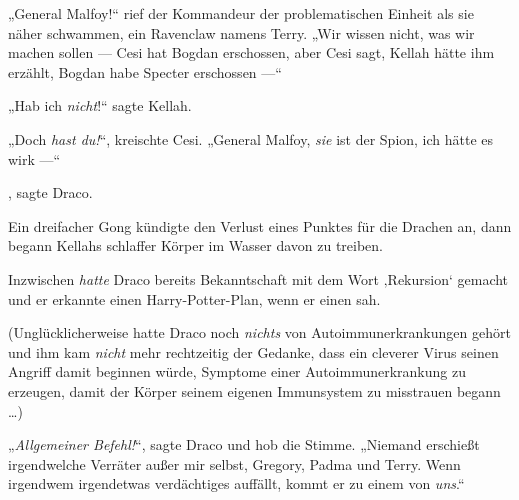 „General Malfoy!“ rief der Kommandeur der problematischen Einheit als sie näher schwammen, ein Ravenclaw namens Terry.
„Wir wissen nicht, was wir machen sollen — Cesi hat Bogdan erschossen, aber Cesi sagt, Kellah hätte ihm erzählt, Bogdan habe Specter erschossen —“

„Hab ich \emph{nicht}!“ sagte Kellah.

„Doch \emph{hast du!}“, kreischte Cesi.
„General Malfoy, \emph{sie} ist der Spion, ich hätte es wirk —“

, sagte Draco.

Ein dreifacher Gong kündigte den Verlust eines Punktes für die Drachen an, dann begann Kellahs schlaffer Körper im Wasser davon zu treiben.

Inzwischen \emph{hatte} Draco bereits Bekanntschaft mit dem Wort ‚Rekursion‘ gemacht und er erkannte einen Harry-Potter-Plan, wenn er einen sah.

(Unglücklicherweise hatte Draco noch \emph{nichts} von Autoimmunerkrankungen gehört und ihm kam \emph{nicht} mehr rechtzeitig der Gedanke, dass ein cleverer Virus seinen Angriff damit beginnen würde, Symptome einer Autoimmunerkrankung zu erzeugen, damit der Körper seinem eigenen Immunsystem zu misstrauen begann …)

„\emph{Allgemeiner Befehl!}“, sagte Draco und hob die Stimme.
„Niemand erschießt irgendwelche Verräter außer mir selbst, Gregory, Padma und Terry. Wenn irgendwem irgendetwas verdächtiges auffällt, kommt er zu einem von \emph{uns}.“

